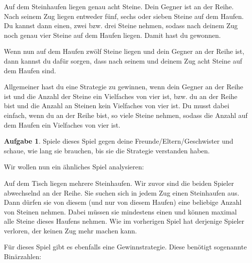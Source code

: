 \documentclass[a4paper,ngerman,12pt]{scrartcl}
\theoremstyle{definition}
\newtheorem*{aufg}{Aufgabe}
\begin{document}
Auf dem Steinhaufen liegen genau acht Steine. Dein Gegner ist an der Reihe. Nach seinem Zug liegen entweder fünf, sechs oder sieben Steine auf dem Haufen. Du kannst dann einen, zwei bzw. drei Steine nehmen, sodass nach deinem Zug noch genau vier Steine auf dem Haufen liegen. Damit hast du gewonnen.

Wenn nun auf dem Haufen zwölf Steine liegen und dein Gegner an der Reihe ist, dann kannst du dafür sorgen, dass nach seinem und deinem Zug acht Steine auf dem Haufen sind.

Allgemeiner hast du eine Strategie zu gewinnen, wenn dein Gegner an der Reihe ist und die Anzahl der Steine ein Vielfaches von vier ist, bzw. du an der Reihe bist und die Anzahl an Steinen kein Vielfaches von vier ist. Du musst dabei einfach, wenn du an der Reihe bist, so viele Steine nehmen, sodass die Anzahl auf dem Haufen ein Vielfaches von vier ist.

\begin{aufg}
  Spiele dieses Spiel gegen deine Freunde/Eltern/Geschwister und schaue, wie lang sie brauchen, bis sie die Strategie verstanden haben.
\end{aufg}

Wir wollen nun ein ähnliches Spiel analysieren:

Auf dem Tisch liegen mehrere Steinhaufen. Wir zuvor sind die beiden Spieler abwechselnd an der Reihe. Sie suchen sich in jedem Zug einen Steinhaufen aus. Dann dürfen sie von diesem (und nur von diesem Haufen) eine beliebige Anzahl von Steinen nehmen. Dabei müssen sie mindestens einen und können maximal alle Steine dieses Haufens nehmen. Wie im vorherigen Spiel hat derjenige Spieler verloren, der keinen Zug mehr machen kann.

Für dieses Spiel gibt es ebenfalls eine Gewinnstrategie. Diese benötigt sogenannte Binärzahlen:
\end{document}
